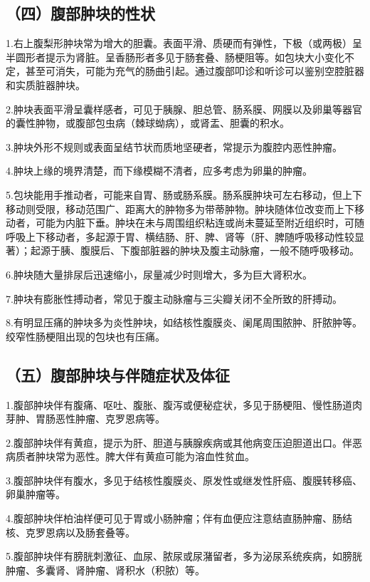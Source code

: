 \subsection{（四）腹部肿块的性状}

1.右上腹梨形肿块常为增大的胆囊。表面平滑、质硬而有弹性，下极（或两极）呈半圆形者提示为肾脏。呈香肠形者多见于肠套叠、肠梗阻等。如包块大小变化不定，甚至可消失，可能为充气的肠曲引起。通过腹部叩诊和听诊可以鉴别空腔脏器和实质脏器肿块。

2.肿块表面平滑呈囊样感者，可见于胰腺、胆总管、肠系膜、网膜以及卵巢等器官的囊性肿物，或腹部包虫病（棘球蚴病），或肾盂、胆囊的积水。

3.肿块外形不规则或表面呈结节状而质地坚硬者，常提示为腹腔内恶性肿瘤。

4.肿块上缘的境界清楚，而下缘模糊不清者，应多考虑为卵巢的肿瘤。

5.包块能用手推动者，可能来自胃、肠或肠系膜。肠系膜肿块可左右移动，但上下移动则受限，移动范围广、距离大的肿物多为带蒂肿物。肿块随体位改变而上下移动者，可能为内脏下垂。肿块在未与周围组织粘连或尚未蔓延至附近组织时，可随呼吸上下移动者，多起源于胃、横结肠、肝、脾、肾等（肝、脾随呼吸移动性较显著）；起源于胰、腹膜后、下腹部脏器的肿块及腹主动脉瘤，一般不随呼吸移动。

6.肿块随大量排尿后迅速缩小，尿量减少时则增大，多为巨大肾积水。

7.肿块有膨胀性搏动者，常见于腹主动脉瘤与三尖瓣关闭不全所致的肝搏动。

8.有明显压痛的肿块多为炎性肿块，如结核性腹膜炎、阑尾周围脓肿、肝脓肿等。绞窄性肠梗阻出现的包块也有压痛。

\subsection{（五）腹部肿块与伴随症状及体征}

1.腹部肿块伴有腹痛、呕吐、腹胀、腹泻或便秘症状，多见于肠梗阻、慢性肠道肉芽肿、胃肠恶性肿瘤、克罗恩病等。

2.腹部肿块伴有黄疸，提示为肝、胆道与胰腺疾病或其他病变压迫胆道出口。伴恶病质者肿块常为恶性。脾大伴有黄疸可能为溶血性贫血。

3.腹部肿块伴有腹水，多见于结核性腹膜炎、原发性或继发性肝癌、腹膜转移癌、卵巢肿瘤等。

4.腹部肿块伴柏油样便可见于胃或小肠肿瘤；伴有血便应注意结直肠肿瘤、肠结核、克罗恩病以及肠套叠等。

5.腹部肿块伴有膀胱刺激征、血尿、脓尿或尿潴留者，多为泌尿系统疾病，如膀胱肿瘤、多囊肾、肾肿瘤、肾积水（积脓）等。

